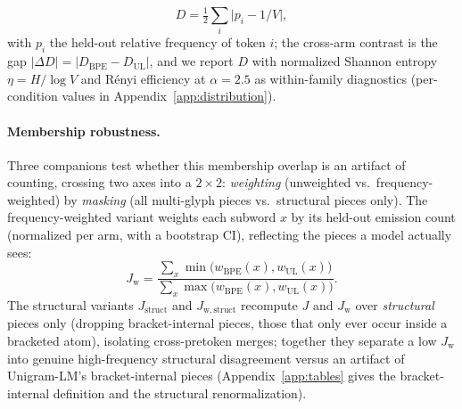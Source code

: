 \documentclass{article}
\begin{document}
\begin{itemize}
    \begin{equation}\label{eq:imbalance}
      D = \tfrac{1}{2}\sum_i \big|p_i - 1/V\big|,
    \end{equation}
    with $p_i$ the held-out relative frequency of token $i$; the cross-arm
    contrast is the gap $|\Delta D| = |D_{\text{BPE}}-D_{\text{UL}}|$, and we
    report $D$ with
    normalized Shannon entropy $\eta = H/\log V$ and R\'enyi efficiency at
    $\alpha{=}2.5$ \citep{zouhar2023noiseless-channel} as within-family
    diagnostics \citep{schmidt2024tokenization-more-than-compression,
    cognetta2024two-counterexamples} (per-condition values in
    Appendix~\ref{app:distribution}).
\end{itemize}

\paragraph{Membership robustness.}
Three companions test whether this membership overlap is an artifact of
counting, crossing two axes into a $2\times2$: \emph{weighting} (unweighted
vs.\ frequency-weighted) by \emph{masking} (all multi-glyph pieces vs.\
structural pieces only). The frequency-weighted variant weights each subword
$x$ by its held-out emission count (normalized per arm, with a bootstrap CI),
reflecting the pieces a model actually sees:
\begin{equation}\label{eq:jw}
  J_{\mathrm{w}} = \frac{\sum_x \min\!\big(w_{\text{BPE}}(x), w_{\text{UL}}(x)\big)}
                        {\sum_x \max\!\big(w_{\text{BPE}}(x), w_{\text{UL}}(x)\big)}.
\end{equation}
The structural variants $J_{\mathrm{struct}}$ and $J_{\mathrm{w,struct}}$
recompute $J$ and $J_{\mathrm{w}}$ over \emph{structural} pieces only (dropping
bracket-internal pieces, those that only ever occur inside a bracketed atom),
isolating cross-pretoken merges; together they separate a low $J_{\mathrm{w}}$
into genuine high-frequency structural disagreement versus an artifact of
Unigram-LM's bracket-internal pieces
(Appendix~\ref{app:tables} gives the bracket-internal definition and the
structural renormalization).
\end{document}
